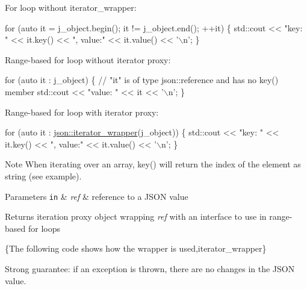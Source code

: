 For loop without iterator\+\_\+wrapper\+:


\begin{DoxyCode}
\textcolor{keywordflow}{for} (\textcolor{keyword}{auto} it = j\_object.begin(); it != j\_object.end(); ++it)
\{
    std::cout << \textcolor{stringliteral}{"key: "} << it.key() << \textcolor{stringliteral}{", value:"} << it.value() << \textcolor{charliteral}{'\(\backslash\)n'};
\}
\end{DoxyCode}


Range-\/based for loop without iterator proxy\+:


\begin{DoxyCode}
\textcolor{keywordflow}{for} (\textcolor{keyword}{auto} it : j\_object)
\{
    \textcolor{comment}{// "it" is of type json::reference and has no key() member}
    std::cout << \textcolor{stringliteral}{"value: "} << it << \textcolor{charliteral}{'\(\backslash\)n'};
\}
\end{DoxyCode}


Range-\/based for loop with iterator proxy\+:


\begin{DoxyCode}
\textcolor{keywordflow}{for} (\textcolor{keyword}{auto} it : \hyperlink{classnlohmann_1_1basic__json_a22e2e5b0e68d9d7c63be2cada5187259}{json::iterator\_wrapper}(j\_object))
\{
    std::cout << \textcolor{stringliteral}{"key: "} << it.key() << \textcolor{stringliteral}{", value:"} << it.value() << \textcolor{charliteral}{'\(\backslash\)n'};
\}
\end{DoxyCode}


\begin{DoxyNote}{Note}
When iterating over an array, {\ttfamily key()} will return the index of the element as string (see example).
\end{DoxyNote}

\begin{DoxyParams}[1]{Parameters}
\mbox{\tt in}  & {\em ref} & reference to a J\+S\+ON value \\
\hline
\end{DoxyParams}
\begin{DoxyReturn}{Returns}
iteration proxy object wrapping {\itshape ref} with an interface to use in range-\/based for loops
\end{DoxyReturn}
\{The following code shows how the wrapper is used,iterator\+\_\+wrapper\}

Strong guarantee\+: if an exception is thrown, there are no changes in the J\+S\+ON value.

